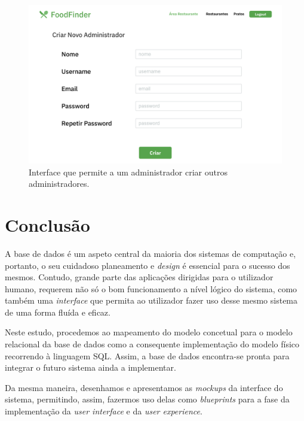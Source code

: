 \documentclass[a4paper,12pt]{report}
\begin{document}
	
	\begin{figure}[H]
	\begin{center}
	\includegraphics[scale=0.25]{22.1-Criar_Novo_Administrador}	
	\end{center}
	\caption{Interface que permite a um administrador criar outros administradores.}
	\end{figure} 
	
	

	

\chapter{Conclusão}	

	A base de dados é um aspeto central da maioria dos sistemas de computação e, portanto, o seu cuidadoso planeamento e \textit{design} é essencial para o sucesso dos mesmos. Contudo, grande parte das aplicações dirigidas para o utilizador humano, requerem não só o bom funcionamento a nível lógico do sistema, como também uma \textit{interface} que permita ao utilizador fazer uso desse mesmo sistema de uma forma fluída e eficaz.  
	
	Neste estudo, procedemos ao mapeamento do modelo concetual para o modelo relacional da base de dados como a consequente implementação do modelo físico recorrendo à linguagem SQL. Assim, a base de dados encontra-se pronta para integrar o futuro sistema ainda a implementar.
	
	Da mesma maneira, desenhamos e apresentamos as \textit{mockups} da interface do sistema, permitindo, assim, fazermos uso delas como \textit{blueprints} para a fase da implementação da \textit{user interface} e da \textit{user experience}.
	
\end{document}
